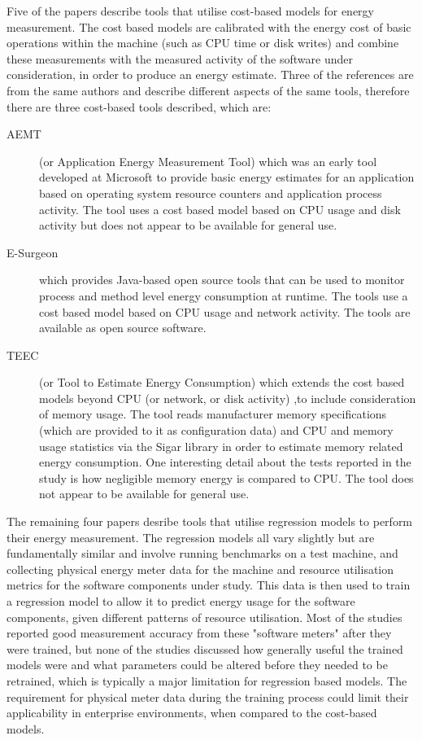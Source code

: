 Five of the papers describe tools that utilise cost-based models for energy measurement.  The cost based models are calibrated with the energy cost of basic operations within the machine (such as CPU time or disk writes) and combine these measurements with the measured activity of the software under consideration, in order to produce an energy estimate.  Three of the references are from the same authors and describe different aspects of the same tools, therefore there are three cost-based tools described, which are:
\begin{description}
	\item[AEMT] (or Application Energy Measurement Tool) which was an early tool developed at Microsoft to provide basic energy estimates for an application based on operating system resource counters and application process activity.  The tool uses a cost based model based on CPU usage and disk activity but does not appear to be available for general use.  \cite{kansal2008-energyprofiling}
	\item[E-Surgeon] which provides Java-based open source tools that can be used to monitor process and method level energy consumption at runtime.  The tools use a cost based model based on CPU usage and network activity. The tools are available as open source software. \cite{noureddine2012-hotspots, noureddine2014-energyutest, noureddine2015-hotspots, noureddine2016-jolinar}
	\item[TEEC] (or Tool to Estimate Energy Consumption) which extends the cost based models beyond CPU (or network, or disk activity) ,to include consideration of memory usage. The tool reads manufacturer memory specifications (which are provided to it as configuration data) and CPU and memory usage statistics via the Sigar library in order to estimate memory related energy consumption. One interesting detail about the tests reported in the study is how negligible memory energy is compared to CPU.  The tool does not appear to be available for general use. \cite{acar2016-beyondcpu}
\end{description}

The remaining four papers desribe tools that utilise regression models to perform their energy measurement.  The regression models all vary slightly but are fundamentally similar and involve running benchmarks on a test machine, and collecting physical energy meter data for the machine and resource utilisation metrics for the software components under study.  This data is then used to train a regression model to allow it to predict energy usage for the software components, given different patterns of resource utilisation.  Most of the studies reported good measurement accuracy from these "software meters" after they were trained, but none of the studies discussed how generally useful the trained models were and what parameters could be altered before they needed to be retrained, which is typically a major limitation for regression based models.  The requirement for physical meter data during the training process could limit their applicability in enterprise environments, when compared to the cost-based models.

